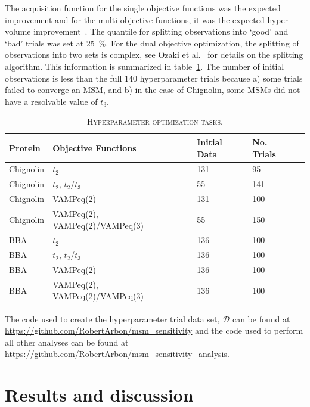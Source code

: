 \documentclass[journal=jacsat,manuscript=article]{achemso}
\begin{document}
The acquisition function for the single objective functions was the expected improvement and for the multi-objective functions, it was the expected hyper-volume improvement~\cite{ozaki_multitpe_2022}. The quantile for splitting observations into `good' and `bad' trials was set at \SI{25}{\percent}. For the dual objective optimization, the splitting of observations into two sets is complex, see Ozaki et al.~\cite{ozaki_multitpe_2022} for details on the splitting algorithm. This information is summarized in table~\ref{tab:opt_description}. The number of initial observations is less than the full \num{140} hyperparameter trials because a) some trials failed to converge an MSM, and b) in the case of Chignolin, some MSMs did not have a resolvable value of $t_3$.  

\begin{table}[ht]
    \caption{\textsc{Hyperparameter optimization tasks.}}
    \begin{tabularx}{\textwidth}{llXXX}
    \toprule
    \textbf{Protein} & \textbf{Objective Functions} & \textbf{Initial Data} & \textbf{No. Trials} \\ 
    
    \midrule
    Chignolin & $t_2$        & 131 & 95 \\
    Chignolin & $t_2$, $t_2$/$t_3$ & 55 & 141 \\
    Chignolin & VAMPeq(2) & 131 & 100 \\

    Chignolin & VAMPeq(2), VAMPeq(2)/VAMPeq(3) & 55 & 150 \\

    BBA & $t_2$        & 136 & 100 \\
    BBA & $t_2$, $t_2$/$t_3$ & 136 & 100 \\
    BBA & VAMPeq(2) & 136 & 100 \\
    BBA & VAMPeq(2), VAMPeq(2)/VAMPeq(3) & 136 & 100 \\
    \bottomrule
    \end{tabularx}
    \label{tab:opt_description}
\end{table}

The code used to create the hyperparameter trial data set, $\mathcal{D}$ can be found at \url{https://github.com/RobertArbon/msm_sensitivity} and the code used to perform all other analyses can be found at \url{https://github.com/RobertArbon/msm_sensitivity_analysis}.  

\section{Results and discussion}
\end{document}
